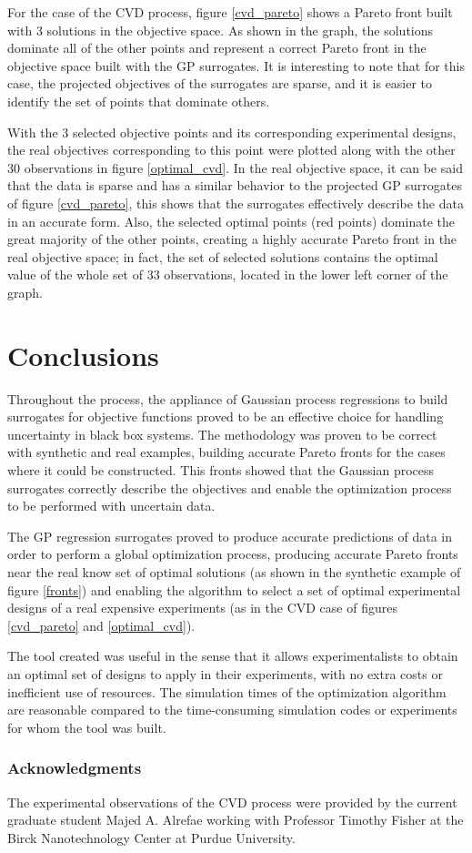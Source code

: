 \documentclass{article}
\begin{document}
For the case of the CVD process, figure \ref{cvd_pareto} shows a Pareto front built with 3 solutions in the objective space. As shown in the graph, the solutions dominate all of the other points and represent a correct Pareto front in the objective space built with the GP surrogates. It is interesting to note that for this case, the projected objectives of the surrogates are sparse, and it is easier to identify the set of points that dominate others.

With the 3 selected objective points and its corresponding experimental designs, the real objectives corresponding to this point were plotted along with the other 30 observations in figure \ref{optimal_cvd}. In the real objective space, it can be said that the data is sparse and has a similar behavior to the projected GP surrogates of figure \ref{cvd_pareto}, this shows that the surrogates effectively describe the data in an accurate form. Also, the selected optimal points (red points) dominate the great majority of the other points, creating a highly accurate Pareto front in the real objective space; in fact, the set of selected solutions contains the optimal value of the whole set of 33 observations, located in the lower left corner of the graph.

\section{Conclusions}

Throughout the process, the appliance of Gaussian process regressions to build surrogates for objective functions proved to be an effective choice for handling uncertainty in black box systems. The methodology was proven to be correct with synthetic and real examples, building accurate Pareto fronts for the cases where it could be constructed. This fronts showed that the Gaussian process surrogates correctly describe the objectives and enable the optimization process to be performed with uncertain data.

The GP regression surrogates proved to produce accurate predictions of data in order to perform a global optimization process, producing accurate Pareto fronts near the real know set of optimal solutions (as shown in the synthetic example of figure \ref{fronts}) and enabling the algorithm to select a set of optimal experimental designs of a real expensive experiments (as in the CVD case of figures \ref{cvd_pareto} and \ref{optimal_cvd}).

The tool created was useful in the sense that it allows experimentalists to obtain an optimal set of designs to apply in their experiments, with no extra costs or inefficient use of resources. The simulation times of the optimization algorithm are reasonable compared to the time-consuming simulation codes or experiments for whom the tool was built.

\subsubsection*{Acknowledgments}
The experimental observations of the CVD process were provided by the current graduate student Majed A. Alrefae working with Professor Timothy Fisher at the Birck Nanotechnology Center at Purdue University.



\end{document}
